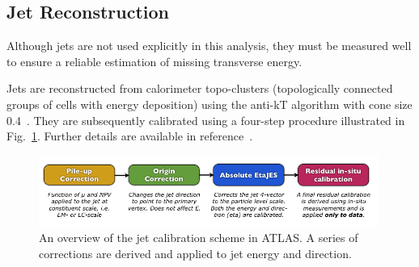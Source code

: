 \subsection{Jet Reconstruction}
Although jets are not used explicitly in this analysis, they must be measured well to ensure a reliable estimation of missing transverse energy.

Jets are reconstructed from calorimeter topo-clusters (topologically connected groups of cells with energy deposition) using the anti-kT algorithm with cone size 0.4~\cite{Cacciari:2008gp}. They are subsequently calibrated using a four-step procedure illustrated in Fig.~\ref{fig:perf:jetcalib}. Further details are available in reference~\cite{ATLAS-CONF-2013-004}.

\begin{figure}[phtb]
  \begin{center}
    \includegraphics[width=0.99\textwidth]{perf/fig/calib}
 \caption{ An overview of the jet calibration scheme in ATLAS. A series of corrections are derived and applied to jet energy and direction.}
 \label{fig:perf:jetcalib}
 \end{center}
\end{figure}
